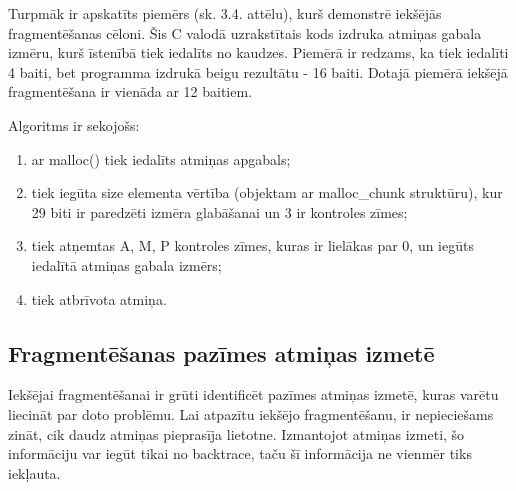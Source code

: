 Turpmāk ir apskatīts piemērs (sk. 3.4. attēlu), kurš demonstrē iekšējās fragmentēšanas cēloni.
Šis C valodā uzrakstītais kods izdruka atmiņas gabala izmēru, kurš īstenībā tiek iedalīts no kaudzes.
Piemērā ir redzams, ka tiek iedalīti 4 baiti, bet programma izdrukā beigu rezultātu - 16 baiti.
Dotajā piemērā iekšējā fragmentēšana ir vienāda ar 12 baitiem.

Algoritms ir sekojošs: 
\begin{enumerate}
\item ar malloc() tiek iedalīts atmiņas apgabals;
\item  tiek iegūta size elementa vērtība (objektam ar malloc\_chunk struktūru), kur 29 biti ir paredzēti izmēra glabāšanai un 3 ir kontroles zīmes;
\item  tiek atņemtas A, M, P kontroles zīmes, kuras ir lielākas par 0, un iegūts iedalītā atmiņas gabala izmērs;
\item  tiek atbrīvota atmiņa.
\end{enumerate}



\subsection{Fragmentēšanas pazīmes atmiņas izmetē}

Iekšējai fragmentēšanai ir grūti identificēt pazīmes atmiņas izmetē, kuras varētu liecināt par doto problēmu.
Lai atpazītu iekšējo fragmentēšanu, ir nepieciešams zināt, cik daudz atmiņas pieprasīja lietotne.
Izmantojot atmiņas izmeti, šo informāciju var iegūt tikai no backtrace, taču šī informācija ne vienmēr tiks iekļauta.

